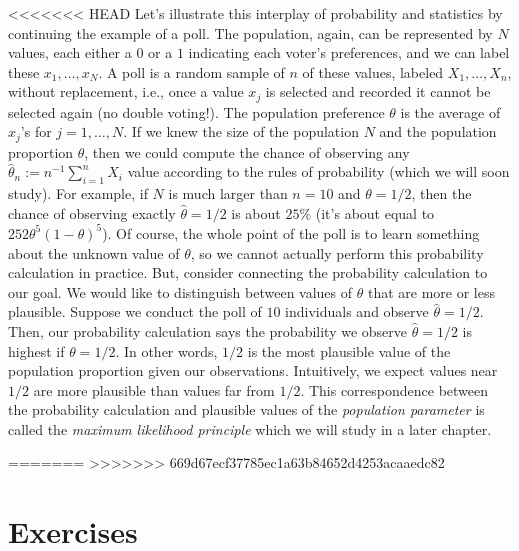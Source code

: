 \documentclass[]{book}
\begin{document}
<<<<<<< HEAD
Let's illustrate this interplay of probability and statistics by
continuing the example of a poll. The population, again, can be
represented by \(N\) values, each either a \(0\) or a \(1\) indicating
each voter's preferences, and we can label these \(x_1, \ldots, x_N\). A
poll is a random sample of \(n\) of these values, labeled
\(X_1, \ldots,X_n\), without replacement, i.e., once a value \(x_j\) is
selected and recorded it cannot be selected again (no double voting!).
The population preference \(\theta\) is the average of \(x_j\)'s for
\(j=1, \ldots, N\). If we knew the size of the population \(N\) and the
population proportion \(\theta\), then we could compute the chance of
observing any \(\hat\theta_n := n^{-1}\sum_{i=1}^n X_i\) value according
to the rules of probability (which we will soon study). For example, if
\(N\) is much larger than \(n = 10\) and \(\theta = 1/2\), then the
chance of observing exactly \(\hat\theta = 1/2\) is about \(25\%\) (it's
about equal to \(252\theta^5(1-\theta)^5\)). Of course, the whole point
of the poll is to learn something about the unknown value of \(\theta\),
so we cannot actually perform this probability calculation in practice.
But, consider connecting the probability calculation to our goal. We
would like to distinguish between values of \(\theta\) that are more or
less plausible. Suppose we conduct the poll of \(10\) individuals and
observe \(\hat\theta = 1/2\). Then, our probability calculation says the
probability we observe \(\hat\theta = 1/2\) is highest if
\(\theta = 1/2\). In other words, \(1/2\) is the most plausible value of
the population proportion given our observations. Intuitively, we expect
values near \(1/2\) are more plausible than values far from \(1/2\).
This correspondence between the probability calculation and plausible
values of the \emph{population parameter} is called the \emph{maximum
likelihood principle} which we will study in a later chapter.

=======
>>>>>>> 669d67ecf37785ec1a63b84652d4253acaaedc82
\section{Exercises}\label{exercises}
\end{document}
